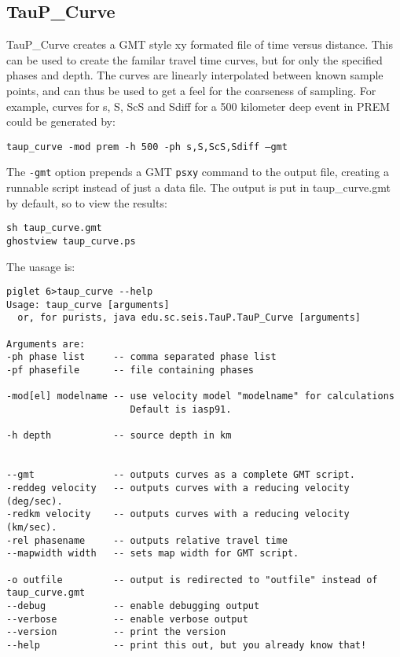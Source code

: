 \subsection{TauP\_Curve}
TauP\_Curve creates a GMT style xy formated file of time versus distance. 
This can be used to create the familar travel time curves, but for
only the specified phases and depth. The curves are linearly interpolated 
between known sample points, and can thus be used to get a feel for the 
coarseness of sampling. For example, curves for s, S, ScS and Sdiff
for a 500 kilometer deep event in PREM could be generated by:

\texttt{taup\_curve -mod prem -h 500 -ph s,S,ScS,Sdiff --gmt}

The \texttt{-gmt} option prepends a GMT \texttt{psxy} command to the output 
file, creating a runnable script instead of just a data file. 
The output is put in taup\_curve.gmt by default, so to view the results:

\begin{verbatim}
sh taup_curve.gmt
ghostview taup_curve.ps
\end{verbatim}

The uasage is:
\begin{verbatim}
piglet 6>taup_curve --help
Usage: taup_curve [arguments]
  or, for purists, java edu.sc.seis.TauP.TauP_Curve [arguments]

Arguments are:
-ph phase list     -- comma separated phase list
-pf phasefile      -- file containing phases

-mod[el] modelname -- use velocity model "modelname" for calculations
                      Default is iasp91.

-h depth           -- source depth in km


--gmt              -- outputs curves as a complete GMT script.
-reddeg velocity   -- outputs curves with a reducing velocity (deg/sec).
-redkm velocity    -- outputs curves with a reducing velocity (km/sec).
-rel phasename     -- outputs relative travel time
--mapwidth width   -- sets map width for GMT script.

-o outfile         -- output is redirected to "outfile" instead of taup_curve.gmt
--debug            -- enable debugging output
--verbose          -- enable verbose output
--version          -- print the version
--help             -- print this out, but you already know that!
\end{verbatim} 
 
